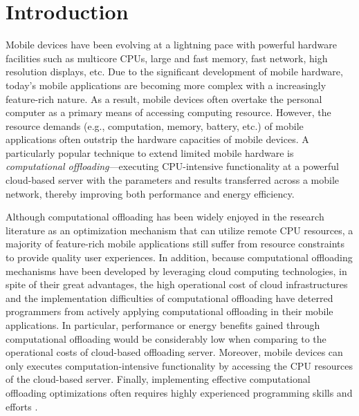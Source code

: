 \documentclass[conference]{IEEEtran}
\begin{document}
%
\IEEEpeerreviewmaketitle


\section{Introduction}
Mobile devices have been evolving at a lightning pace with powerful hardware facilities such as multicore CPUs, large and fast memory, fast network, high resolution displays, etc. Due to the significant development of mobile hardware, today's mobile applications are becoming more complex with a increasingly feature-rich nature. As a result, mobile devices often overtake the personal computer as a primary means of accessing computing resource. However, the resource demands (e.g., computation, memory, battery, etc.) of mobile applications often outstrip the hardware capacities of mobile devices. A particularly popular technique to extend limited mobile hardware is \emph{computational offloading}---executing CPU-intensive functionality at a powerful cloud-based server with the parameters and results transferred across a mobile network, thereby improving both performance and energy efficiency. 

Although computational offloading has been widely enjoyed in the research literature as an optimization mechanism that can utilize remote CPU resources, a majority of feature-rich mobile applications still suffer from resource constraints to provide quality user experiences. In addition, because computational offloading mechanisms have been developed by leveraging cloud computing technologies, in spite of their great advantages, the high operational cost of cloud infrastructures and the implementation difficulties of computational offloading have deterred programmers from actively applying computational offloading in their mobile applications. In particular, performance or energy benefits gained through computational offloading would be considerably low when comparing to the operational costs of cloud-based offloading server. Moreover, mobile devices can only executes computation-intensive functionality by accessing the CPU resources of the cloud-based server. Finally, implementing effective computational offloading optimizations often requires highly experienced programming skills and efforts \cite{kwon+:mobilesoft15}.
\end{document}
